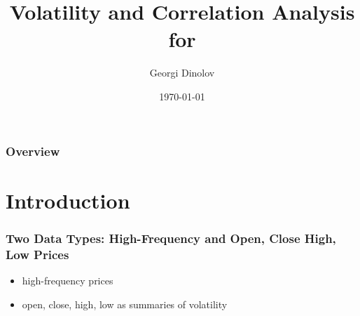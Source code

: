 \documentclass{beamer}
\title[]{Volatility and Correlation Analysis for } %
\author{Georgi Dinolov} %
\institute[UCSC] %
{
University of California, Santa Cruz \\ %
\medskip
\textit{gdinolov@soe.ucsc.edu} %
}
\date{\today} %
\begin{document}
\begin{frame}
\titlepage %
\end{frame}

\begin{frame}
\frametitle{Overview} %
\tableofcontents %
\end{frame}


\section{Introduction}

\begin{frame}
\frametitle{Two Data Types: High-Frequency and Open, Close High, Low Prices}
\begin{itemize}
  \item high-frequency prices
  \item open, close, high, low as summaries of volatility
\end{itemize}
\end{frame}

\end{document}
